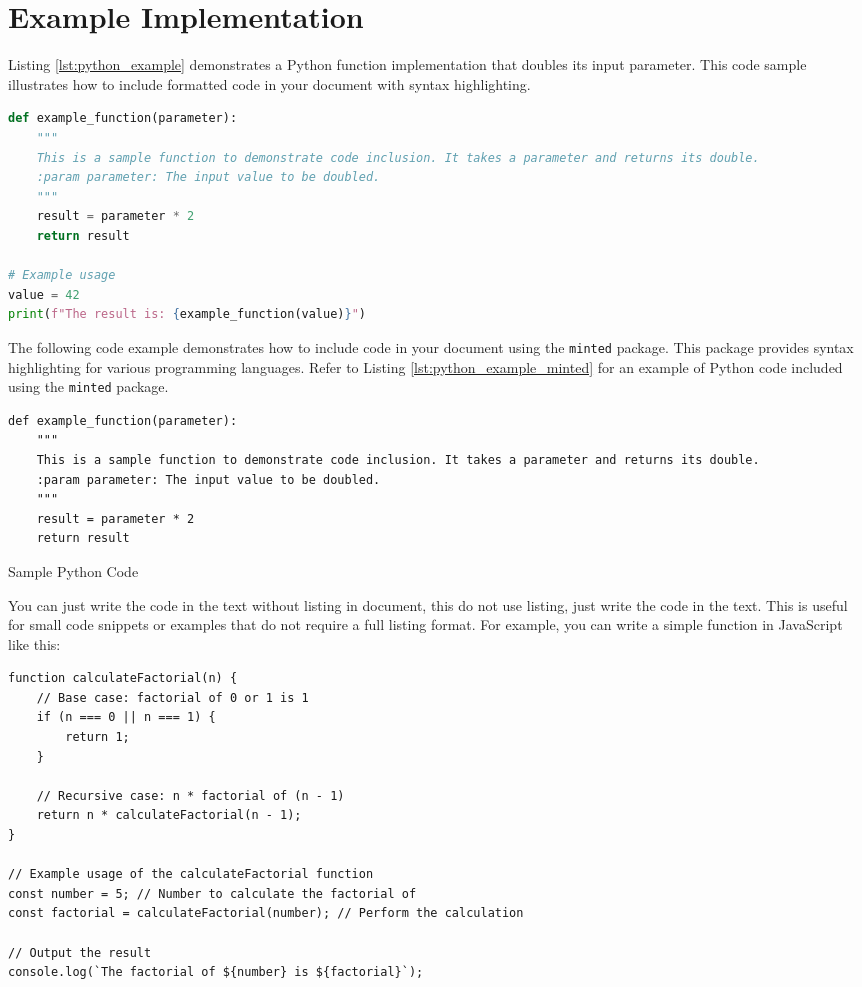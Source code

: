 
\section{Example Implementation}
Listing \ref{lst:python_example} demonstrates a Python function implementation that doubles its input parameter. This code sample illustrates how to include formatted code in your document with syntax highlighting.

\begin{lstlisting}[language=Python, caption=Example Python Code, breaklines=true, label=lst:python_example]
def example_function(parameter):
    """
    This is a sample function to demonstrate code inclusion. It takes a parameter and returns its double.
    :param parameter: The input value to be doubled.
    """
    result = parameter * 2
    return result

# Example usage
value = 42
print(f"The result is: {example_function(value)}")
\end{lstlisting}
The following code example demonstrates how to include code in your document using the \texttt{minted} package. This package provides syntax highlighting for various programming languages. Refer to Listing \ref{lst:python_example_minted} for an example of Python code included using the \texttt{minted} package.
\begin{listing}[H]
\begin{verbatim}
def example_function(parameter):
    """
    This is a sample function to demonstrate code inclusion. It takes a parameter and returns its double.
    :param parameter: The input value to be doubled.
    """
    result = parameter * 2
    return result
\end{verbatim}
\caption{Sample Python Code}
\label{lst:python_example_minted}
\end{listing}


You can just write the code in the text without listing in document, this do not use listing, just write the code in the text. This is useful for small code snippets or examples that do not require a full listing format. For example, you can write a simple function in JavaScript like this:
\begin{verbatim}
function calculateFactorial(n) {
    // Base case: factorial of 0 or 1 is 1
    if (n === 0 || n === 1) {
        return 1;
    }

    // Recursive case: n * factorial of (n - 1)
    return n * calculateFactorial(n - 1);
}

// Example usage of the calculateFactorial function
const number = 5; // Number to calculate the factorial of
const factorial = calculateFactorial(number); // Perform the calculation

// Output the result
console.log(`The factorial of ${number} is ${factorial}`);
\end{verbatim}

